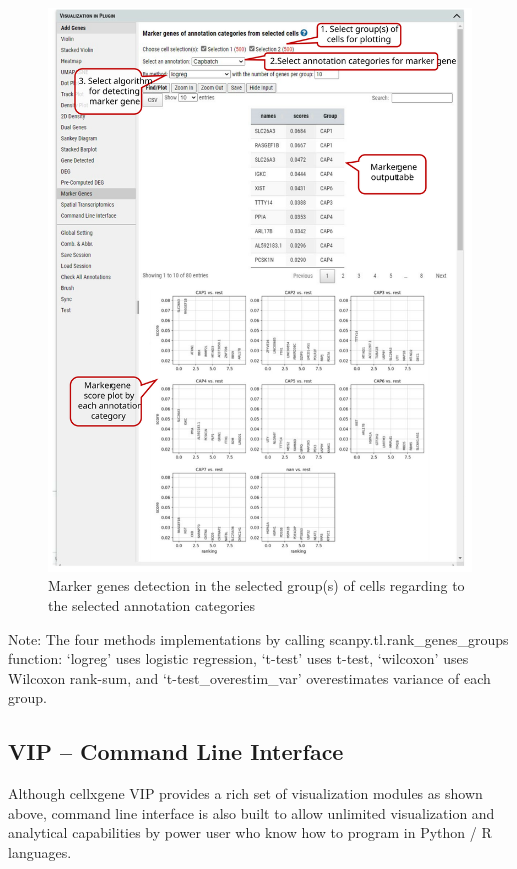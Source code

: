 \documentclass[
]{article}
\begin{document}
\begin{figure}
\centering
\includegraphics{figures/F22_label.svg}
\caption{Marker genes detection in the selected group(s) of cells regarding to the selected annotation categories}
\end{figure}

Note: The four methods implementations by calling scanpy.tl.rank\_genes\_groups function: `logreg' uses logistic regression, `t-test' uses t-test, `wilcoxon' uses Wilcoxon rank-sum, and `t-test\_overestim\_var' overestimates variance of each group.

\hypertarget{vip-command-line-interface}{%
\subsection{VIP -- Command Line Interface}\label{vip-command-line-interface}}

Although cellxgene VIP provides a rich set of visualization modules as shown above, command line interface is also built to allow unlimited visualization and analytical capabilities by power user who know how to program in Python / R languages.
\end{document}
